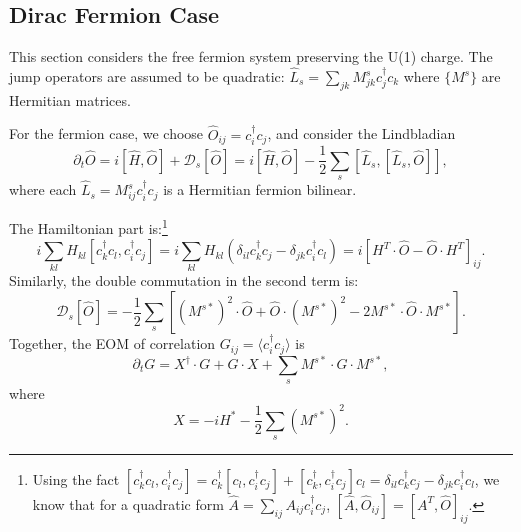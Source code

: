\documentclass{SciPost}
\begin{document}
\subsection{Dirac Fermion Case}

This section considers the free fermion system preserving the U(1) charge. The jump operators are assumed to be quadratic: $\hat L_s = \sum_{jk} M^s_{jk} c_j^\dagger c_k$ where $\{M^s\}$ are Hermitian matrices.

For the fermion case, we choose $\hat O_{ij} = c_i^\dagger c_j$, and consider the Lindbladian
\begin{equation}
	\partial_t \hat O = i[\hat H, \hat O] + \mathcal D_s[\hat O]
	= i[\hat H, \hat O] - \frac{1}{2} \sum_s [\hat L_s,[\hat L_s,\hat O]],
\end{equation}
where each $\hat L_s = M^s_{ij} c_i^\dagger c_j$ is a Hermitian fermion bilinear.


The Hamiltonian part is:\footnote{Using the fact
$[c_k^\dagger c_l, c_i^\dagger c_j] = c_k^\dagger[c_l,c_i^\dagger c_j] + [c_k^\dagger,c_i^\dagger c_j]c_l =\delta_{il}c_k^\dagger c_j -\delta_{jk}c_i^\dagger c_l$, we know that for a quadratic form $\hat A = \sum_{ij} A_{ij} c_i^\dagger c_j$, $[\hat A, \hat O_{ij}] = [A^T, \hat O]_{ij}$.}
\begin{equation}
	i \sum_{kl}H_{kl}[c_k^\dagger c_l, c_i^\dagger c_j]
	= i \sum_{kl} H_{kl} (\delta_{il}c_k^\dagger c_j -\delta_{jk}c_i^\dagger c_l) 
	= i [H^T\cdot \hat O - \hat O\cdot H^T]_{ij}.
\end{equation}
Similarly, the double commutation in the second term is:
\begin{equation}
	\mathcal D_s[\hat O]
	= -\frac{1}{2}\sum_s [(M^{s*})^2\cdot\hat O + \hat O\cdot (M^{s*})^2 - 2 M^{s*}\cdot \hat O \cdot M^{s*}].
\end{equation}
Together, the EOM of correlation $G_{ij} = \langle c_i^\dagger c_j\rangle$ is
\begin{equation}
	\partial_t G = X^\dagger \cdot G + G \cdot X + \sum_s M^{s*}\cdot G \cdot M^{s*},
\end{equation}
where 
\begin{equation}
	X = -i H^* - \frac{1}{2}\sum_s (M^{s*})^2.
\end{equation}






%

\end{document}
